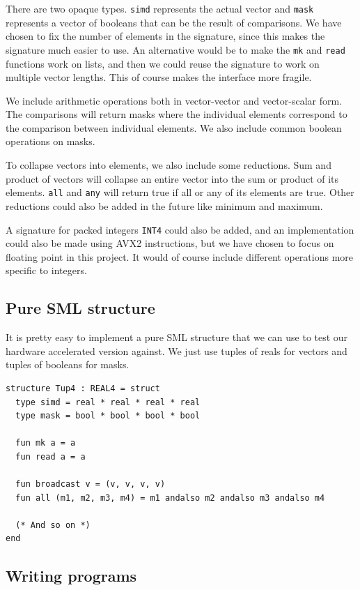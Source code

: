 \documentclass{article}
\begin{document}
There are two opaque types. \verb!simd! represents the actual vector and \verb!mask! represents a vector of booleans that can be the result of comparisons. We have chosen to fix the number of elements in the signature, since this makes the signature much easier to use. An alternative would be to make the \verb!mk! and \verb!read! functions work on lists, and then we could reuse the signature to work on multiple vector lengths. This of course makes the interface more fragile.

We include arithmetic operations both in vector-vector and vector-scalar form. The comparisons will return masks where the individual elements correspond to the comparison between individual elements. We also include common boolean operations on masks.

To collapse vectors into elements, we also include some reductions. Sum and product of vectors will collapse an entire vector into the sum or product of its elements. \verb!all! and \verb!any! will return true if all or any of its elements are true. Other reductions could also be added in the future like minimum and maximum.


A signature for packed integers \texttt{INT4} could also be added, and an implementation could also be made using AVX2 instructions, but we have chosen to focus on floating point in this project. It would of course include different operations more specific to integers.

\subsection{Pure SML structure}

It is pretty easy to implement a pure SML structure that we can use to test our hardware accelerated version against. We just use tuples of reals for vectors and tuples of booleans for masks.
\begin{lstlisting}[frame=single, label={lst:tup4}, caption={Implementation of \texttt{REAL4} using tuples}]
structure Tup4 : REAL4 = struct
  type simd = real * real * real * real
  type mask = bool * bool * bool * bool

  fun mk a = a
  fun read a = a

  fun broadcast v = (v, v, v, v)
  fun all (m1, m2, m3, m4) = m1 andalso m2 andalso m3 andalso m4

  (* And so on *)
end
\end{lstlisting}

\subsection{Writing programs}
\end{document}
